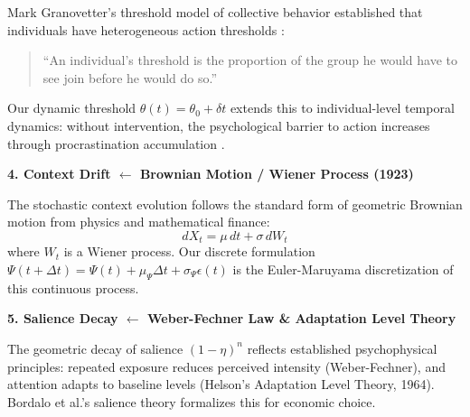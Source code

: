 \documentclass[11pt, a4paper]{article}
\begin{document}
\begin{tcolorbox}[colback=blue!5!white, colframe=blue!75!black,
    title=\textbf{Scientific Foundations: NTM in Historical Context}]
Mark Granovetter's threshold model of collective behavior established that individuals have heterogeneous action thresholds \citep{granovetter1978threshold}:
\begin{quote}
``An individual's threshold is the proportion of the group he would have to see join before he would do so.''
\end{quote}

Our dynamic threshold $\theta(t) = \theta_0 + \delta t$ extends this to individual-level temporal dynamics: without intervention, the psychological barrier to action increases through procrastination accumulation \citep{akerlof1991procrastination, odonoghue2001choice}.

\vspace{0.5em}
\textbf{4. Context Drift $\leftarrow$ Brownian Motion / Wiener Process (1923)}

The stochastic context evolution follows the standard form of geometric Brownian motion from physics and mathematical finance:
\begin{equation}
dX_t = \mu \, dt + \sigma \, dW_t
\end{equation}
where $W_t$ is a Wiener process. Our discrete formulation $\Psi(t+\Delta t) = \Psi(t) + \mu_\Psi \Delta t + \sigma_\Psi \epsilon(t)$ is the Euler-Maruyama discretization of this continuous process.

\vspace{0.5em}
\textbf{5. Salience Decay $\leftarrow$ Weber-Fechner Law \& Adaptation Level Theory}

The geometric decay of salience $(1-\eta)^n$ reflects established psychophysical principles: repeated exposure reduces perceived intensity (Weber-Fechner), and attention adapts to baseline levels (Helson's Adaptation Level Theory, 1964). Bordalo et al.'s salience theory \citep{PAP-bordalo2012salience} formalizes this for economic choice.

\end{tcolorbox}
\end{document}
